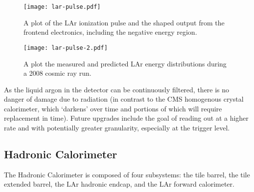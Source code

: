 
\begin{figure}
\centering
\texttt{[image: lar-pulse.pdf]}
\caption{A plot of the LAr ionization pulse and the shaped output from the frontend electronics, including the negative energy region.}
\label{fig:detector:lar-pulse}
\end{figure}



\begin{figure}
\centering
\texttt{[image: lar-pulse-2.pdf]}
\caption{A plot the measured and predicted LAr energy distributions during a 2008 cosmic ray run.}
\label{fig:detector:lar-pulse-2}
\end{figure}


As the liquid argon in the detector can be continuously filtered, there is no danger of damage due to radiation (in contrast to the CMS homogenous crystal calorimeter, which `darkens' over time and portions of which will require replacement in time). Future upgrades include the goal of reading out at a higher rate and with potentially greater granularity, especially at the trigger level.



\subsection{Hadronic Calorimeter}

The Hadronic Calorimeter is composed of four subsystems: the tile barrel, the tile extended barrel, the LAr hadronic endcap, and the LAr forward calorimeter. 

